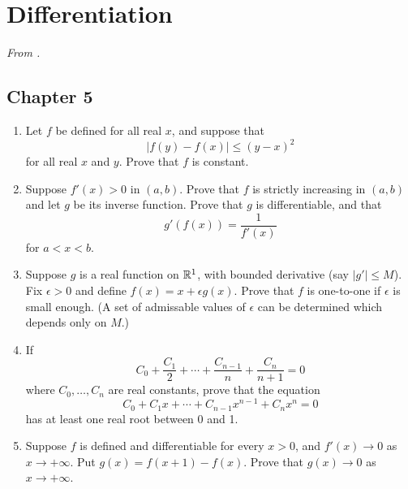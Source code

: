 \documentclass[../psets.tex]{subfiles}
\begin{document}
\section{Differentiation}
\emph{From \textcite{bib:Rudin}.}
\subsection*{Chapter 5}
\begin{enumerate}[label={\textbf{\arabic*.}}]
    \item Let $f$ be defined for all real $x$, and suppose that
    \begin{equation*}
        |f(y)-f(x)| \leq (y-x)^2
    \end{equation*}
    for all real $x$ and $y$. Prove that $f$ is constant.
    \item Suppose $f'(x)>0$ in $(a,b)$. Prove that $f$ is strictly increasing in $(a,b)$ and let $g$ be its inverse function. Prove that $g$ is differentiable, and that
    \begin{equation*}
        g'(f(x)) = \frac{1}{f'(x)}
    \end{equation*}
    for $a<x<b$.
    \item Suppose $g$ is a real function on $\mathbb{R}^1$, with bounded derivative (say $|g'|\leq M$). Fix $\epsilon>0$ and define $f(x)=x+\epsilon g(x)$. Prove that $f$ is one-to-one if $\epsilon$ is small enough. (A set of admissable values of $\epsilon$ can be determined which depends only on $M$.)
    \item If
    \begin{equation*}
        C_0+\frac{C_1}{2}+\cdots+\frac{C_{n-1}}{n}+\frac{C_n}{n+1} = 0
    \end{equation*}
    where $C_0,\dots,C_n$ are real constants, prove that the equation
    \begin{equation*}
        C_0+C_1x+\cdots+C_{n-1}x^{n-1}+C_nx^n = 0
    \end{equation*}
    has at least one real root between 0 and 1.
    \item Suppose $f$ is defined and differentiable for every $x>0$, and $f'(x)\to 0$ as $x\to+\infty$. Put $g(x)=f(x+1)-f(x)$. Prove that $g(x)\to 0$ as $x\to+\infty$.
\end{enumerate}
\end{document}
